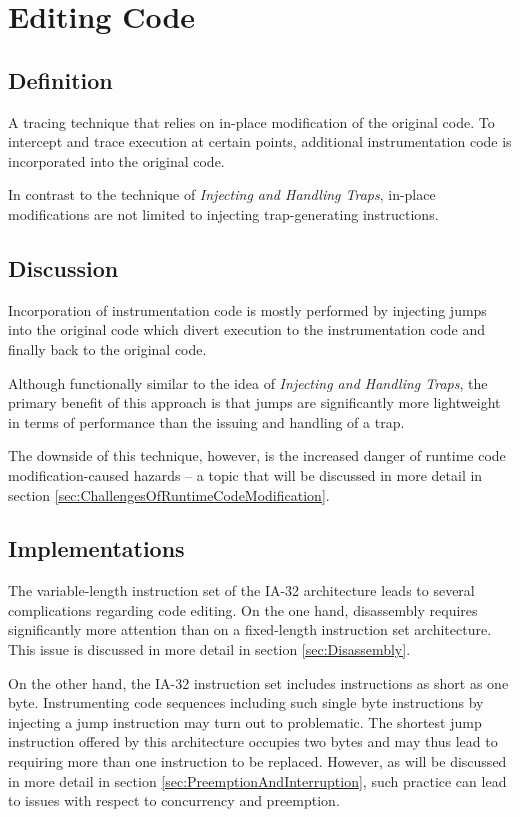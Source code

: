 \section{Editing Code}
\label{sec:EditingCode}
\subsection*{Definition}
A tracing technique that relies on in-place modification of the original code. To
intercept and trace execution at certain points, additional instrumentation code 
is incorporated into the original code.

In contrast to the technique of \emph{Injecting and Handling Traps}, in-place
modifications are not limited to injecting trap-generating instructions.

\subsection*{Discussion}
Incorporation of instrumentation code is mostly performed by injecting jumps
into the original code which divert execution to the instrumentation code and
finally back to the original code.

Although functionally similar to the idea of \emph{Injecting and Handling Traps},
the primary benefit of this approach is that jumps are significantly more lightweight
in terms of performance than the issuing and handling of a trap.

The downside of this technique, however, is the increased danger of 
runtime code modification-caused hazards -- a topic that will be discussed in
more detail in section \ref{sec:ChallengesOfRuntimeCodeModification}.



\subsection*{Implementations}
The variable-length instruction set of the IA-32 architecture leads to several 
complications regarding code editing. On the one hand, disassembly requires 
significantly more attention than on a fixed-length instruction set architecture. 
This issue is discussed in more detail in section \ref{sec:Disassembly}. 

On the other hand, the IA-32 instruction set includes instructions as short as
one byte. Instrumenting code sequences including such single byte instructions by 
injecting a jump instruction may turn out to problematic. The shortest jump 
instruction offered by this architecture occupies two bytes and may thus lead
to requiring more than one instruction to be replaced. However, as will be discussed
in more detail in section \ref{sec:PreemptionAndInterruption}, such practice
can lead to issues with respect to concurrency and preemption.

